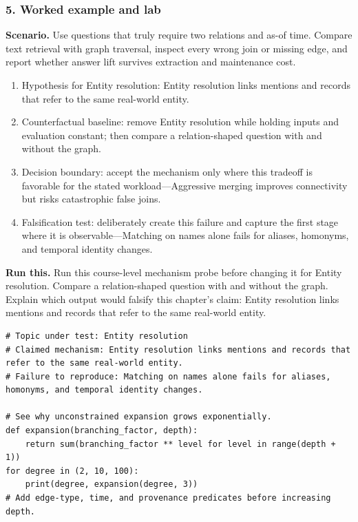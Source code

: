 \subsubsection*{5. Worked example and lab}
\textbf{Scenario.} Use questions that truly require two relations and as-of time. Compare text retrieval with graph traversal, inspect every wrong join or missing edge, and report whether answer lift survives extraction and maintenance cost.
\begin{enumerate}
\item Hypothesis for Entity resolution: Entity resolution links mentions and records that refer to the same real-world entity.
\item Counterfactual baseline: remove Entity resolution while holding inputs and evaluation constant; then compare a relation-shaped question with and without the graph.
\item Decision boundary: accept the mechanism only where this tradeoff is favorable for the stated workload—Aggressive merging improves connectivity but risks catastrophic false joins.
\item Falsification test: deliberately create this failure and capture the first stage where it is observable—Matching on names alone fails for aliases, homonyms, and temporal identity changes.
\end{enumerate}
\textbf{Run this.} Run this course-level mechanism probe before changing it for Entity resolution. Compare a relation-shaped question with and without the graph. Explain which output would falsify this chapter's claim: Entity resolution links mentions and records that refer to the same real-world entity.
\begin{Verbatim}[fontsize=\scriptsize]
# Topic under test: Entity resolution
# Claimed mechanism: Entity resolution links mentions and records that refer to the same real-world entity.
# Failure to reproduce: Matching on names alone fails for aliases, homonyms, and temporal identity changes.

# See why unconstrained expansion grows exponentially.
def expansion(branching_factor, depth):
    return sum(branching_factor ** level for level in range(depth + 1))
for degree in (2, 10, 100):
    print(degree, expansion(degree, 3))
# Add edge-type, time, and provenance predicates before increasing depth.
\end{Verbatim}
